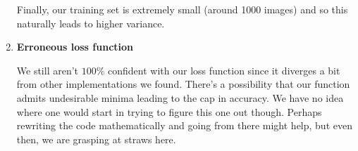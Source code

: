 \begin{enumerate}[left=0pt]
Finally, our training set is extremely small (around 1000 images) and so this naturally leads to higher variance.

\item \bf{Erroneous loss function}

We still aren't $100\%$ confident with our loss function since it diverges a bit from other implementations we found.
There's a possibility that our function admits undesirable minima leading to the cap in accuracy. 
We have no idea where one would start in trying to figure this one out though.
Perhaps rewriting the code mathematically and going from there might help, but even then, we are grasping at straws here.

\end{enumerate}